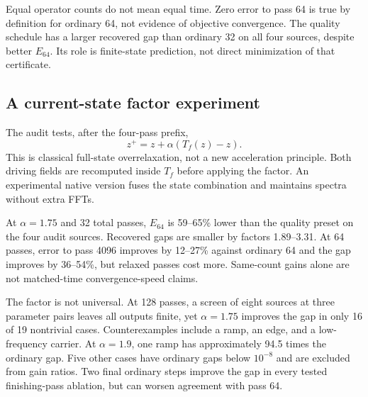 \documentclass[10pt,twocolumn]{article}
\theoremstyle{definition}\newtheorem{remark}[proposition]{Remark}
\newcommand{\Tf}{T_f}
\begin{document}


Equal operator counts do not mean equal time. Zero error to pass 64 is
true by definition for ordinary 64, not evidence of objective convergence.
The quality schedule has a larger recovered gap than ordinary 32 on all
four sources, despite better $E_{64}$. Its role is finite-state prediction,
not direct minimization of that certificate.

\subsection{A current-state factor experiment}
The audit tests, after the four-pass prefix,
\begin{equation}
z^+=z+\alpha(\Tf(z)-z).
\label{eq:relax}
\end{equation}
This is classical full-state overrelaxation, not a new acceleration
principle. Both driving fields are recomputed inside $\Tf$ before applying
the factor. An experimental native version fuses the state combination
and maintains spectra without extra FFTs.

At $\alpha=1.75$ and 32 total passes, $E_{64}$ is 59--65\% lower than
the quality preset on the four audit sources. Recovered gaps are smaller
by factors 1.89--3.31. At 64 passes, error to pass 4096 improves by
12--27\% against ordinary 64 and the gap improves by 36--54\%, but relaxed
passes cost more. Same-count gains alone are not matched-time
convergence-speed claims.

The factor is not universal. At 128 passes, a screen of eight sources at
three parameter pairs leaves all outputs finite, yet $\alpha=1.75$
improves the gap in only 16 of 19 nontrivial cases. Counterexamples include
a ramp, an edge, and a low-frequency carrier. At $\alpha=1.9$, one ramp
has approximately 94.5 times the ordinary gap. Five other cases have
ordinary gaps below $10^{-8}$ and are excluded from gain ratios.
Two final ordinary steps improve the gap in every tested finishing-pass
ablation, but can worsen agreement with pass 64.
\end{document}
